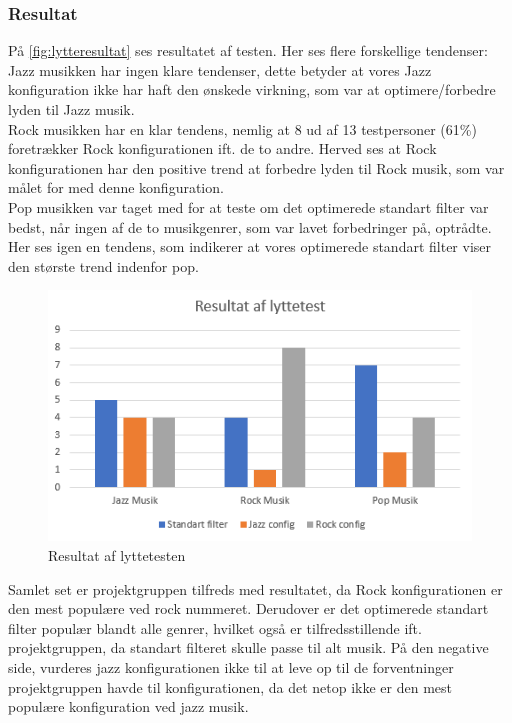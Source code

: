 \subsubsection{Resultat}
På \autoref{fig:lytteresultat} ses resultatet af testen. Her ses flere forskellige tendenser:  \\Jazz musikken har ingen klare tendenser, dette betyder at vores Jazz konfiguration ikke har haft den ønskede virkning, som var at optimere/forbedre lyden til Jazz musik. \\Rock musikken har en klar tendens, nemlig at 8 ud af 13 testpersoner (61\%) foretrækker Rock konfigurationen ift. de to andre. Herved ses at Rock konfigurationen har den positive trend at forbedre lyden til Rock musik, som var målet for med denne konfiguration. \\
Pop musikken var taget med for at teste om det optimerede  standart filter var bedst, når ingen af de to musikgenrer, som var lavet forbedringer på, optrådte. Her ses igen en tendens, som indikerer at vores optimerede standart filter viser den største trend indenfor pop. 
 
\begin{figure}[H] 
	\center
	\includegraphics[width=0.8\linewidth]{figur/lytteresultat}\quad
	\caption{Resultat af lyttetesten}
	\label{fig:lytteresultat}
\end{figure}
Samlet set er projektgruppen tilfreds med resultatet, da Rock konfigurationen er den mest populære ved rock nummeret. Derudover er det optimerede standart filter populær blandt alle genrer, hvilket også er tilfredsstillende ift. projektgruppen, da standart filteret skulle passe til alt musik. På den negative side, vurderes jazz konfigurationen ikke til at leve op til de forventninger projektgruppen havde til konfigurationen, da det netop ikke er den mest populære konfiguration ved jazz musik.  


